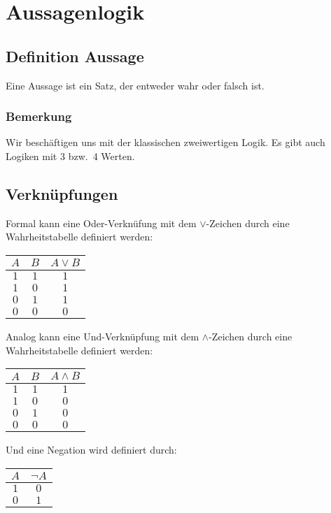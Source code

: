 \section{Aussagenlogik}
\subsection{Definition Aussage}
Eine Aussage ist ein Satz, der entweder wahr oder falsch ist.

\subsubsection{Bemerkung}Wir beschäftigen uns mit der klassischen zweiwertigen
Logik. Es gibt auch Logiken mit 3 bzw.\ 4 Werten.

\subsection{Verknüpfungen}
Formal kann eine Oder-Verknüfung mit dem $\lor$-Zeichen durch eine
Wahrheitstabelle definiert werden:
\begin{center}
    \begin{tabular}{ccc}
        \toprule
        $A$ & $B$ & $A \lor B$ \\
        \midrule
        $1$ & $1$ & $1$ \\
        $1$ & $0$ & $1$ \\
        $0$ & $1$ & $1$ \\
        $0$ & $0$ & $0$ \\
        \bottomrule
    \end{tabular}
\end{center}

Analog kann eine Und-Verknüpfung mit dem $\land$-Zeichen durch eine
Wahrheitstabelle definiert werden:
\begin{center}
    \begin{tabular}{ccc}
        \toprule
        $A$ & $B$ & $A \land B$ \\
        \midrule
        $1$ & $1$ & $1$ \\
        $1$ & $0$ & $0$ \\
        $0$ & $1$ & $0$ \\
        $0$ & $0$ & $0$ \\
        \bottomrule
    \end{tabular}
\end{center}

Und eine Negation wird definiert durch:
\begin{center}
    \begin{tabular}{cc}
        \toprule
        $A$ & $\lnot A$ \\
        \midrule
        $1$ & $0$ \\
        $0$ & $1$ \\
        \bottomrule
    \end{tabular}
\end{center}

